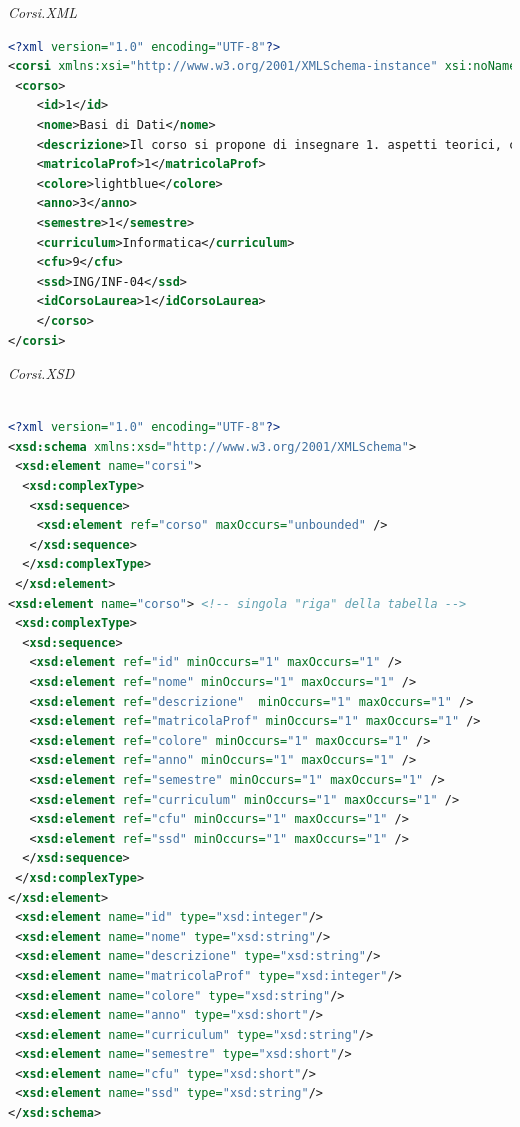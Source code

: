 \documentclass [a4paper,11pt]{book}
\begin{document}
\medskip

\emph{Corsi.XML}

\label{sec:corsi}

\begin{lstlisting}[language=XML]
<?xml version="1.0" encoding="UTF-8"?>
<corsi xmlns:xsi="http://www.w3.org/2001/XMLSchema-instance" xsi:noNamespaceSchemaLocation="corsi.xsd">
 <corso>
    <id>1</id>
    <nome>Basi di Dati</nome>
    <descrizione>Il corso si propone di insegnare 1. aspetti teorici, consistenti in modelli e linguaggi di basi di dati, 2. metodologie di progetto, che consentiranno allo studente, una volta che siano acquisite, di affrontare e risolvere casi concreti, 3. tecnologie, consistenti in diversi strumenti software usati in modo combinato per la implementazione delle basi di dati, scegliendo strumenti diffusi nelle pratiche aziendali. Alla fine del corso lo studente sara in grado di interagire con il destinatario di una applicazione di basi di dati in modo da sintetizzare correttamente i requisiti e di sviluppare prima il progetto, poi la applicazione stessa, scegliendo gli strumenti piu idonei.</descrizione>
    <matricolaProf>1</matricolaProf>
    <colore>lightblue</colore>
    <anno>3</anno>
    <semestre>1</semestre>
    <curriculum>Informatica</curriculum>
    <cfu>9</cfu>
    <ssd>ING/INF-04</ssd>
    <idCorsoLaurea>1</idCorsoLaurea>
    </corso>
</corsi>
\end{lstlisting}

\medskip

\emph{Corsi.XSD}

\begin{lstlisting}[language=XML]

<?xml version="1.0" encoding="UTF-8"?>
<xsd:schema xmlns:xsd="http://www.w3.org/2001/XMLSchema">
 <xsd:element name="corsi">
  <xsd:complexType>
   <xsd:sequence>
    <xsd:element ref="corso" maxOccurs="unbounded" />
   </xsd:sequence>
  </xsd:complexType>
 </xsd:element>
<xsd:element name="corso"> <!-- singola "riga" della tabella -->
 <xsd:complexType>
  <xsd:sequence>
   <xsd:element ref="id" minOccurs="1" maxOccurs="1" /> 
   <xsd:element ref="nome" minOccurs="1" maxOccurs="1" />
   <xsd:element ref="descrizione"  minOccurs="1" maxOccurs="1" />
   <xsd:element ref="matricolaProf" minOccurs="1" maxOccurs="1" />
   <xsd:element ref="colore" minOccurs="1" maxOccurs="1" />
   <xsd:element ref="anno" minOccurs="1" maxOccurs="1" />
   <xsd:element ref="semestre" minOccurs="1" maxOccurs="1" />
   <xsd:element ref="curriculum" minOccurs="1" maxOccurs="1" />
   <xsd:element ref="cfu" minOccurs="1" maxOccurs="1" />
   <xsd:element ref="ssd" minOccurs="1" maxOccurs="1" />
  </xsd:sequence>   
 </xsd:complexType>
</xsd:element>
 <xsd:element name="id" type="xsd:integer"/>
 <xsd:element name="nome" type="xsd:string"/>
 <xsd:element name="descrizione" type="xsd:string"/>
 <xsd:element name="matricolaProf" type="xsd:integer"/>
 <xsd:element name="colore" type="xsd:string"/>
 <xsd:element name="anno" type="xsd:short"/>
 <xsd:element name="curriculum" type="xsd:string"/>
 <xsd:element name="semestre" type="xsd:short"/>
 <xsd:element name="cfu" type="xsd:short"/>
 <xsd:element name="ssd" type="xsd:string"/>
</xsd:schema>
\end{lstlisting}
\end{document}
